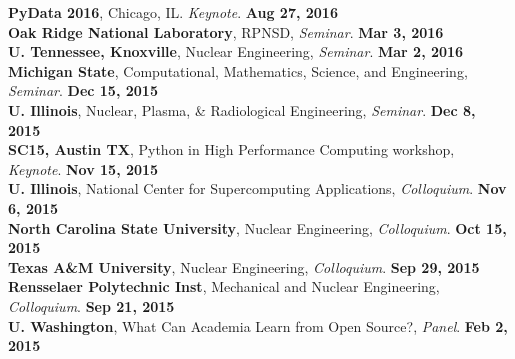 \documentclass[margin,line]{resume}
\begin{document}
\begin{resume}
      \textbf{PyData 2016}, Chicago, IL. \emph{Keynote}.  \hfill\textbf{Aug 27, 2016}\\
      \textbf{Oak Ridge National Laboratory}, RPNSD, \emph{Seminar}.  \hfill\textbf{Mar 3, 2016}\\
      \textbf{U. Tennessee, Knoxville}, Nuclear Engineering, \emph{Seminar}.  \hfill\textbf{Mar 2, 2016}\\
      \textbf{Michigan State}, Computational, Mathematics, Science, and Engineering, \emph{Seminar}.  \hfill\textbf{Dec 15, 2015}\\
      \textbf{U. Illinois}, Nuclear, Plasma, \& Radiological Engineering, \emph{Seminar}.          \hfill\textbf{Dec 8, 2015}\\
      \textbf{SC15, Austin TX}, Python in High Performance Computing workshop, \emph{Keynote}.     \hfill\textbf{Nov 15, 2015}\\
      \textbf{U. Illinois}, National Center for Supercomputing Applications, \emph{Colloquium}.    \hfill\textbf{Nov 6, 2015}\\
      \textbf{North Carolina State University}, Nuclear Engineering, \emph{Colloquium}.            \hfill\textbf{Oct 15, 2015}\\
      \textbf{Texas A\&M University}, Nuclear Engineering, \emph{Colloquium}.                      \hfill\textbf{ Sep 29, 2015}\\
      \textbf{Rensselaer Polytechnic Inst}, Mechanical and Nuclear Engineering, \emph{Colloquium}. \hfill\textbf{Sep 21, 2015}\\
      \textbf{U. Washington}, What Can Academia Learn from Open Source?, \emph{Panel}.   \hfill\textbf{Feb 2, 2015}

\end{resume}
\end{document}
